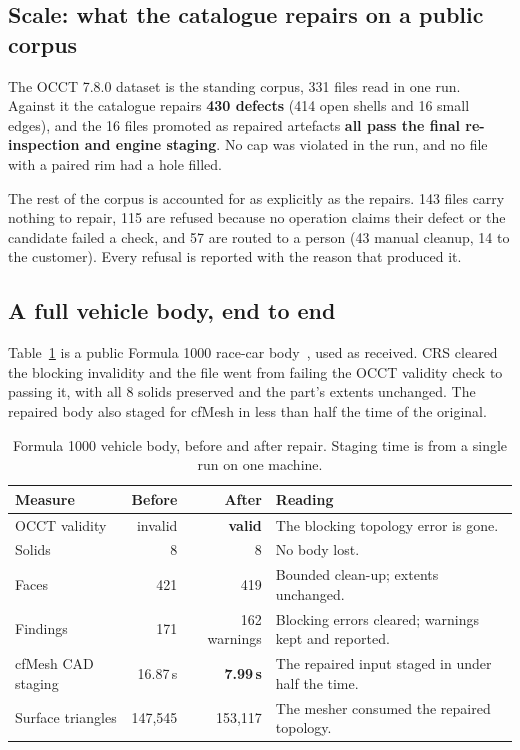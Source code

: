 \documentclass[10pt,onecolumn]{article}
\begin{document}
\subsection{Scale: what the catalogue repairs on a public corpus}\label{sec:scale}

The OCCT 7.8.0 dataset is the standing corpus, 331 files read in one run. Against it the catalogue
repairs \textbf{430 defects} (414 open shells and 16 small edges), and the 16 files promoted as
repaired artefacts \textbf{all pass the final re-inspection and engine staging}. No cap was violated
in the run, and no file with a paired rim had a hole filled.

The rest of the corpus is accounted for as explicitly as the repairs. 143 files carry nothing to
repair, 115 are refused because no operation claims their defect or the candidate failed a check,
and 57 are routed to a person (43 manual cleanup, 14 to the customer). Every refusal is reported
with the reason that produced it.

\subsection{A full vehicle body, end to end}\label{sec:f1000}

Table~\ref{tab:f1000} is a public Formula 1000 race-car body~\cite{f1000}, used as received. CRS
cleared the blocking invalidity and the file went from failing the OCCT validity check to passing
it, with all 8 solids preserved and the part's extents unchanged. The repaired body also staged for
cfMesh in less than half the time of the original.

\begin{table}[h]
\centering
\caption{Formula 1000 vehicle body, before and after repair. Staging time is from a single run on
one machine.}
\label{tab:f1000}
\footnotesize
\begin{tabularx}{\textwidth}{@{}l r r >{\raggedright\arraybackslash}X@{}}
\toprule
\textbf{Measure} & \textbf{Before} & \textbf{After} & \textbf{Reading}\\
\midrule
OCCT validity      & invalid  & \textbf{valid} & The blocking topology error is gone.\\
Solids             & 8        & 8              & No body lost.\\
Faces              & 421      & 419            & Bounded clean-up; extents unchanged.\\
Findings           & 171      & 162 warnings   & Blocking errors cleared; warnings kept and reported.\\
cfMesh CAD staging & 16.87\,s & \textbf{7.99\,s} & The repaired input staged in under half the time.\\
Surface triangles  & 147,545  & 153,117        & The mesher consumed the repaired topology.\\
\bottomrule
\end{tabularx}
\end{table}
\end{document}
